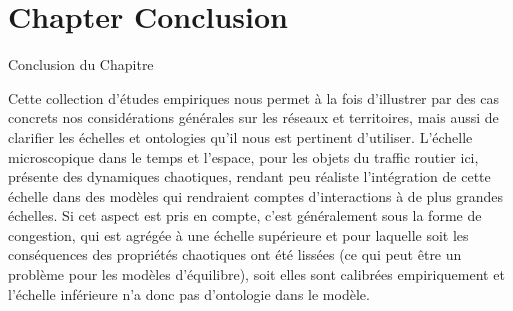 



\newpage


\section*{Chapter Conclusion}{Conclusion du Chapitre}





Cette collection d'études empiriques nous permet à la fois d'illustrer par des cas concrets nos considérations générales sur les réseaux et territoires, mais aussi de clarifier les échelles et ontologies qu'il nous est pertinent d'utiliser. L'échelle microscopique dans le temps et l'espace, pour les objets du traffic routier ici, présente des dynamiques chaotiques, rendant peu réaliste l'intégration de cette échelle dans des modèles qui rendraient comptes d'interactions à de plus grandes échelles. Si cet aspect est pris en compte, c'est généralement sous la forme de congestion, qui est agrégée à une échelle supérieure et pour laquelle soit les conséquences des propriétés chaotiques ont été lissées (ce qui peut être un problème pour les modèles d'équilibre), soit elles sont calibrées empiriquement et l'échelle inférieure n'a donc pas d'ontologie dans le modèle.









\stars

